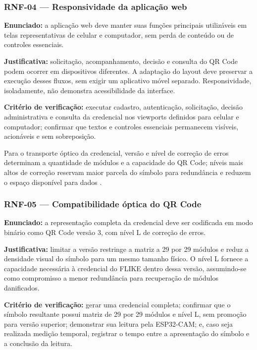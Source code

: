 \subsubsection*{RNF-04 --- Responsividade da aplicação web}

\textbf{Enunciado:} a aplicação web deve manter suas funções principais utilizáveis em telas representativas de celular e computador, sem perda de conteúdo ou de controles essenciais.

\textbf{Justificativa:} solicitação, acompanhamento, decisão e consulta do QR Code podem ocorrer em dispositivos diferentes. A adaptação do layout deve preservar a execução desses fluxos, sem exigir um aplicativo móvel separado. Responsividade, isoladamente, não demonstra acessibilidade da interface.

\textbf{Critério de verificação:} executar cadastro, autenticação, solicitação, decisão administrativa e consulta da credencial nos viewports definidos para celular e computador; confirmar que textos e controles essenciais permanecem visíveis, acionáveis e sem sobreposição.

Para o transporte óptico da credencial, versão e nível de correção de erros determinam a quantidade de módulos e a capacidade do QR Code; níveis mais altos de correção reservam maior parcela do símbolo para redundância e reduzem o espaço disponível para dados \cite{denso2012qressentials}.

\subsubsection*{RNF-05 --- Compatibilidade óptica do QR Code}

\textbf{Enunciado:} a representação completa da credencial deve ser codificada em modo binário como QR Code versão 3, com nível L de correção de erros.

\textbf{Justificativa:} limitar a versão restringe a matriz a 29 por 29 módulos e reduz a densidade visual do símbolo para um mesmo tamanho físico. O nível L fornece a capacidade necessária à credencial do FLIKE dentro dessa versão, assumindo-se como compromisso a menor redundância para recuperação de módulos danificados.

\textbf{Critério de verificação:} gerar uma credencial completa; confirmar que o símbolo resultante possui matriz de 29 por 29 módulos e nível L, sem promoção para versão superior; demonstrar sua leitura pela ESP32-CAM; e, caso seja realizada medição temporal, registrar o tempo entre a apresentação do símbolo e a conclusão da leitura.

